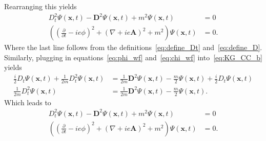 \documentclass[titlepage,letterpaper,onecolumn,11pt,final]{report}
\numberwithin{equation}{section}
\numberwithin{figure}{section}
\begin{document}
Rearranging this yields
\begin{equation}
	\begin{split}
	D_{t}^{2} \Psi (\mathbf{x}, t) - \mathbf{D}^{2} \Psi (\mathbf{x}, t) + m^{2} \Psi (\mathbf{x}, t) &= 0 \\
	\left( \left( \frac{\partial}{\partial t} - i e \phi \right)^{2} + \left( \nabla + i e \mathbf{A} \right)^{2} + m^{2} \right) \Psi (\mathbf{x}, t) &= 0.
	\end{split}
\end{equation}
%
Where the last line follows from the definitions~\ref{eq:define_Dt} and~\ref{eq:define_D}. Similarly, plugging in equations~\ref{eq:phi_wf} and~\ref{eq:chi_wf} into~\ref{eq:KG_CC_b} yields
\begin{equation}
\begin{split}
	\frac{i}{2} D_{t} \Psi (\mathbf{x}, t) + \frac{1}{2 m} D_{t}^{2} \Psi (\mathbf{x}, t) &= \frac{1}{2 m} \mathbf{D}^{2} \Psi (\mathbf{x}, t) - \frac{m}{2} \Psi (\mathbf{x}, t) + \frac{i}{2} D_{t} \Psi (\mathbf{x}, t) \\
	\frac{1}{2 m} D_{t}^{2} \Psi (\mathbf{x}, t) &= \frac{1}{2 m} \mathbf{D}^{2} \Psi (\mathbf{x}, t) - \frac{m}{2} \Psi (\mathbf{x}, t) .
\end{split}
\end{equation}
Which leads to
\begin{equation}
	\begin{split}
	D_{t}^{2} \Psi (\mathbf{x}, t) - \mathbf{D}^{2} \Psi (\mathbf{x}, t) + m^{2} \Psi (\mathbf{x}, t) &= 0 \\
	\left( \left( \frac{\partial}{\partial t} - i e \phi \right)^{2} + \left( \nabla + i e \mathbf{A} \right)^{2} + m^{2} \right) \Psi (\mathbf{x}, t) &= 0.
	\end{split}
\end{equation}
\end{document}
